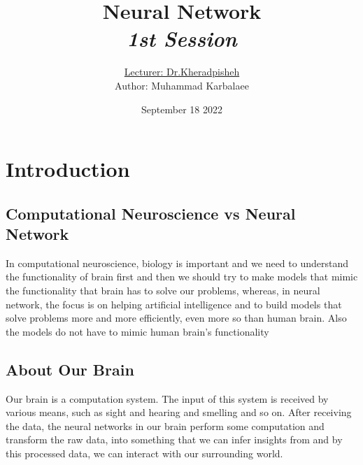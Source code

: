 \documentclass[twocolumn,a4paper, 10pt]{article}
\title{\textbf{Neural Network} \\ \emph{1st Session}}
\author{\underline{Lecturer: Dr.Kheradpisheh} \\ \footnotesize Author: Muhammad Karbalaee}
\date{September 18 2022}
\begin{document}
	\posttitle{\end{center}}
	\maketitle

	\section{Introduction}
	\subsection{Computational Neuroscience vs Neural Network}
		In computational neuroscience, biology is important and we need to
		understand the functionality of brain first and then we should try to
		make models that mimic the functionality that brain has to solve our problems,
		whereas, in neural network, the focus is on helping artificial intelligence and
		to build models that solve problems more and more efficiently, even more so than
		human brain. Also the models do not have to mimic human brain's functionality

	\subsection{About Our Brain}
		Our brain is a computation system. The input of this system is received by 
		various means, such as sight and hearing and smelling and so on. 
		After receiving the data, the neural networks in our brain perform some computation 
		and transform the raw data, into something that we can infer insights from and by this 
		processed data, we can interact with our surrounding world.
		
\end{document}
